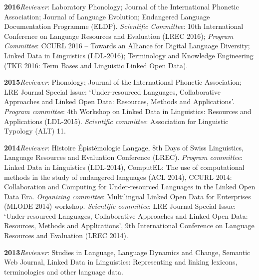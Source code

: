 \documentclass[11pt]{article}
\newcommand{\hangpara}{
 \setlength{\parindent}{0in} %
 \hangindent=0.42in %
}
\begin{document}
\vskip 6pt
\hangpara
{\bf 2016}\hspace{1ex}\textit{Reviewer}: Laboratory Phonology; Journal of the International Phonetic Association; Journal of Language Evolution; Endangered Language Documentation Programme (ELDP).
\textit{Scientific Committee}: 10th International Conference on Language Resources and Evaluation (LREC 2016); \textit{Program Committee}: CCURL 2016 -- Towards an Alliance for Digital Language Diversity; Linked Data in Linguistics (LDL-2016); Terminology and Knowledge Engineering (TKE 2016: Term Bases and Linguistic Linked Open Data).


\vskip 6pt
\hangpara
{\bf 2015}\hspace{1ex}\textit{Reviewer}: Phonology; Journal of the International Phonetic Association; LRE Journal Special Issue: `Under-resourced Languages, Collaborative Approaches and Linked Open Data: Resources, Methods and Applications'. \textit{Program committee}: 4th Workshop on Linked Data in Linguistics: Resources and Applications (LDL-2015). \textit{Scientific committee}: Association for Linguistic Typology (ALT) 11.

\vskip 6pt
\hangpara
{\bf 2014}\hspace{1ex}\textit{Reviewer}: Histoire {\'E}pist{\'e}mologie Langage, 8th Days of Swiss Linguistics, Language Resources and Evaluation Conference (LREC). \textit{Program committee}: Linked Data in Linguistics (LDL-2014), ComputEL: The use of computational methods in the study of endangered languages (ACL 2014), CCURL 2014: Collaboration and Computing for Under-resourced Languages in the Linked Open Data Era. \textit{Organizing committee}: Multilingual Linked Open Data for Enterprises (MLODE 2014) workshop. \textit{Scientific committee}: LRE Journal Special Issue: `Under-resourced Languages, Collaborative Approaches and Linked Open Data: Resources, Methods and Applications', 9th International Conference on Language Resources and Evaluation (LREC 2014).

\vskip 6pt
\hangpara
{\bf 2013}\hspace{1ex}\textit{Reviewer}: Studies in Language, Language Dynamics and Change, Semantic Web Journal, Linked Data in Linguistics: Representing and linking lexicons, terminologies and other language data.
\end{document}
